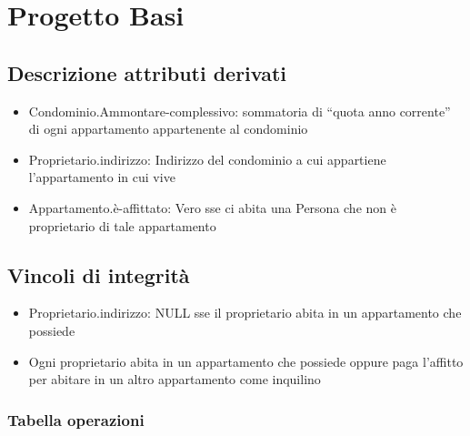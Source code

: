 \documentclass[
]{article}
\author{}
\date{}
\providecommand{\tightlist}{%
  \setlength{\itemsep}{0pt}\setlength{\parskip}{0pt}}
\begin{document}
\hypertarget{progetto-basi}{%
\section{Progetto Basi}\label{progetto-basi}}

\hypertarget{descrizione-attributi-derivati}{%
\subsection{Descrizione attributi
derivati}\label{descrizione-attributi-derivati}}

\begin{itemize}
\tightlist
\item
  Condominio.Ammontare-complessivo: sommatoria di ``quota anno
  corrente'' di ogni appartamento appartenente al condominio
\item
  Proprietario.indirizzo: Indirizzo del condominio a cui appartiene
  l'appartamento in cui vive
\item
  Appartamento.è-affittato: Vero sse ci abita una Persona che non è
  proprietario di tale appartamento
\end{itemize}

\hypertarget{vincoli-di-integrituxe0}{%
\subsection{Vincoli di integrità}\label{vincoli-di-integrituxe0}}

\begin{itemize}
\tightlist
\item
  Proprietario.indirizzo: NULL sse il proprietario abita in un
  appartamento che possiede
\item
  Ogni proprietario abita in un appartamento che possiede oppure paga
  l'affitto per abitare in un altro appartamento come inquilino
\end{itemize}

\hypertarget{tabella-operazioni}{%
\subsubsection{Tabella operazioni}\label{tabella-operazioni}}
\end{document}
